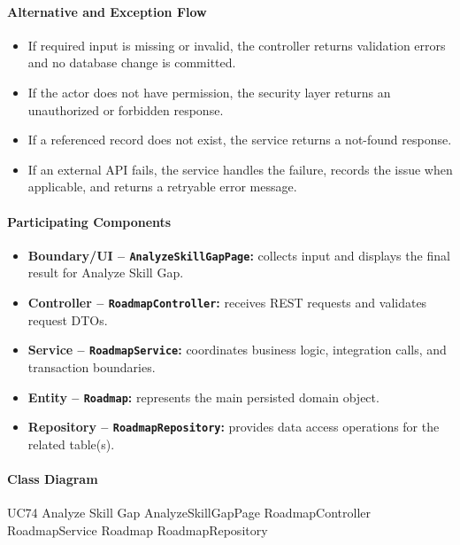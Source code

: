 \paragraph{Alternative and Exception Flow}

\begin{itemize}
    \item If required input is missing or invalid, the controller returns validation errors and no database change is committed.
    \item If the actor does not have permission, the security layer returns an unauthorized or forbidden response.
    \item If a referenced record does not exist, the service returns a not-found response.
    \item If an external API fails, the service handles the failure, records the issue when applicable, and returns a retryable error message.
\end{itemize}

\paragraph{Participating Components}

\begin{itemize}
    \item \textbf{Boundary/UI -- \texttt{AnalyzeSkillGapPage}:} collects input and displays the final result for Analyze Skill Gap.
    \item \textbf{Controller -- \texttt{RoadmapController}:} receives REST requests and validates request DTOs.
    \item \textbf{Service -- \texttt{RoadmapService}:} coordinates business logic, integration calls, and transaction boundaries.
    \item \textbf{Entity -- \texttt{Roadmap}:} represents the main persisted domain object.
    \item \textbf{Repository -- \texttt{RoadmapRepository}:} provides data access operations for the related table(s).
\end{itemize}

\paragraph{Class Diagram}

\ClassDiagram
{UC74 Analyze Skill Gap}
{AnalyzeSkillGapPage}
{RoadmapController}
{RoadmapService}
{Roadmap}
{RoadmapRepository}

